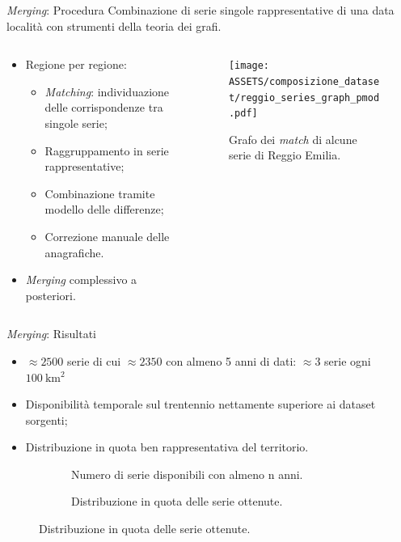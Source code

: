 \begin{frame}[t]{\emph{Merging}: Procedura}
  Combinazione di serie singole rappresentative di una data località con strumenti della teoria dei grafi.
  \begin{columns}
    \begin{column}{0.5\textwidth}
      \begin{itemize}
        \item Regione per regione:
          \begin{itemize}
            \item \emph{Matching}: individuazione delle corrispondenze tra singole serie;
            \item Raggruppamento in serie rappresentative;
            \item Combinazione tramite modello delle differenze;
            \item Correzione manuale delle anagrafiche.
          \end{itemize}
        \item \emph{Merging} complessivo a posteriori.
      \end{itemize}
    \end{column}
    \begin{column}{0.5\textwidth}
      \begin{figure}
        \texttt{[image: ASSETS/composizione\_dataset/reggio\_series\_graph\_pmod.pdf]}
        \caption*{Grafo dei \emph{match} di alcune serie di Reggio Emilia.}
      \end{figure}

    \end{column}
  \end{columns}
\end{frame}

\begin{frame}{\emph{Merging}: Risultati}
  \begin{itemize}
    \item \(\approx 2500\) serie di cui \(\approx 2350\) con almeno 5 anni di dati: \(\approx 3\) serie ogni \(\qty{100}{\kilo\meter^2}\)
    \item Disponibilità temporale sul trentennio nettamente superiore ai dataset sorgenti;
    \item Distribuzione in quota ben rappresentativa del territorio.
  \end{itemize}
  \begin{figure}
    \centering
    \small
    \begin{subfigure}[t]{0.4\textwidth}
      
      \caption*{Numero di serie disponibili con almeno n anni.}
    \end{subfigure}
    \hfill
    \begin{subfigure}[t]{0.4\textwidth}
      
      \caption*{Distribuzione in quota delle serie ottenute.}
    \end{subfigure}
  \end{figure}
\end{frame}

